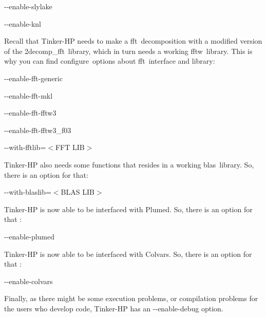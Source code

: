 \begin{DoxyItemize}
\item {\ttfamily -\/-\/enable-\/slylake}
\item {\ttfamily -\/-\/enable-\/knl}
\end{DoxyItemize}

Recall that Tinker-\/\-H\-P needs to make a fft decomposition with a modified version of the 2decomp\-\_\-fft library, which in turn needs a working fftw library. This is why you can find {\ttfamily configure} options about fft interface and library\-:


\begin{DoxyItemize}
\item {\ttfamily -\/-\/enable-\/fft-\/generic}
\item {\ttfamily -\/-\/enable-\/fft-\/mkl}
\item {\ttfamily -\/-\/enable-\/fft-\/fftw3}
\item {\ttfamily -\/-\/enable-\/fft-\/fftw3\-\_\-f03}
\item {\ttfamily -\/-\/with-\/fftlib=}{\ttfamily $<$F\-F\-T L\-I\-B$>$}
\end{DoxyItemize}

Tinker-\/\-H\-P also needs some functions that resides in a working blas library. So, there is an option for that\-:


\begin{DoxyItemize}
\item {\ttfamily -\/-\/with-\/blaslib=}{\ttfamily $<$B\-L\-A\-S L\-I\-B$>$}
\end{DoxyItemize}

Tinker-\/\-H\-P is now able to be interfaced with Plumed. So, there is an option for that \-:


\begin{DoxyItemize}
\item {\ttfamily -\/-\/enable-\/plumed}
\end{DoxyItemize}

Tinker-\/\-H\-P is now able to be interfaced with Colvars. So, there is an option for that \-:


\begin{DoxyItemize}
\item {\ttfamily -\/-\/enable-\/colvars}
\end{DoxyItemize}

Finally, as there might be some execution problems, or compilation problems for the users who develop code, Tinker-\/\-H\-P has an {\ttfamily -\/-\/enable-\/debug} option.

